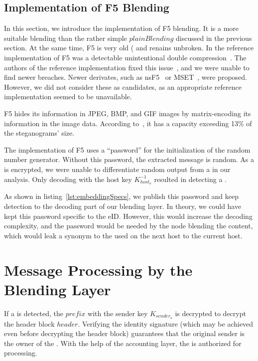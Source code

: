 \subsection{Implementation of F5 Blending}
In this section, we introduce the implementation of F5 blending. It is a more suitable blending than the rather simple $plainBlending$ discussed in the previous section. At the same time, F5 is very old (\citeyear{f5} and renains unbroken. In the reference implementation of F5 was a detectable unintentional double compression~\cite{steganalysisf5}. The authors of the reference implementation fixed this issue~\cite{F5broken}, and we were unable to find newer breaches. Newer derivates, such as nsF5~\cite{fridrich2007statistically} or MSET~\cite{hosseini2015modification}, were proposed. However, we did not consider these as candidates, as an appropriate reference implementation seemed to be unavailable.

F5 hides its information in JPEG, BMP, and GIF images by matrix-encoding its information in the image data. According to~\cite{f5}, it has a capacity exceeding 13\% of the steganograms' size.

The implementation of F5 uses a ``password'' for the initialization of the random number generator. Without this password, the extracted message is random. As a \VortexMessage{} is encrypted, we were unable to differentiate random output from a \VortexMessage in our analysis. Only decoding with the host key $K^{-1}_{host_o}$ resulted in detecting a \VortexMessage.

As shown in listing~\ref{lst:embeddingSpecs}, we publish this password and keep detection to the decoding part of our blending layer. In theory, we could have kept this password specific to the eID. However, this would increase the decoding complexity, and the password would be needed by the node blending the content, which would leak a synonym to the  used on the next host to the current host.

\section{Message Processing by the Blending Layer}
If a \VortexMessage{} is detected, the $prefix$ with the sender key $K_{sender_o}$ is decrypted to decrypt the header block $header$. Verifying the identity signature (which may be achieved even before decrypting the header block) guarantees that the original sender is the owner of the . With the help of the accounting layer, the \VortexMessage{} is authorized for processing. 

